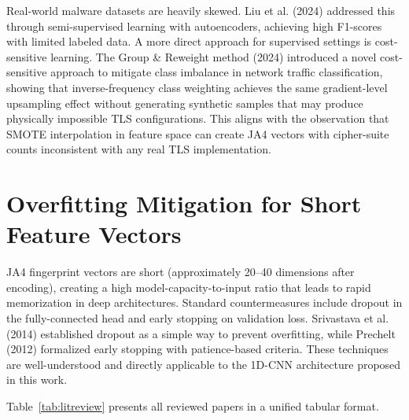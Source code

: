 \documentclass[12pt,a4paper]{report}
\begin{document}
Real-world malware datasets are heavily skewed. Liu et al. (2024) addressed this through semi-supervised learning with autoencoders, achieving high F1-scores with limited labeled data. A more direct approach for supervised settings is cost-sensitive learning. The Group \& Reweight method (2024) introduced a novel cost-sensitive approach to mitigate class imbalance in network traffic classification, showing that inverse-frequency class weighting achieves the same gradient-level upsampling effect without generating synthetic samples that may produce physically impossible TLS configurations. This aligns with the observation that SMOTE interpolation in feature space can create JA4 vectors with cipher-suite counts inconsistent with any real TLS implementation.

\section{Overfitting Mitigation for Short Feature Vectors}

JA4 fingerprint vectors are short (approximately 20--40 dimensions after encoding), creating a high model-capacity-to-input ratio that leads to rapid memorization in deep architectures. Standard countermeasures include dropout in the fully-connected head and early stopping on validation loss. Srivastava et al. (2014) established dropout as a simple way to prevent overfitting, while Prechelt (2012) formalized early stopping with patience-based criteria. These techniques are well-understood and directly applicable to the 1D-CNN architecture proposed in this work.

Table~\ref{tab:litreview} presents all reviewed papers in a unified tabular format.
\end{document}
